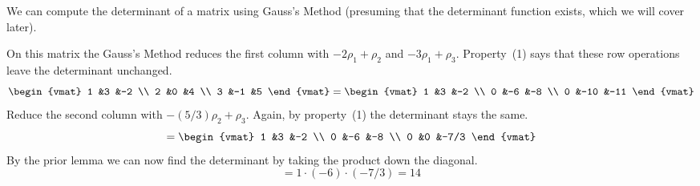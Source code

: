 \documentclass[10pt,t,serif,professionalfont]{beamer}
\begin{document}
\begin{frame}
We can compute the determinant of a matrix using Gauss's Method
(presuming that the determinant function exists, which we will
cover later).

\ex  On this matrix the Gauss's Method reduces the first column  with 
$-2\rho_1+\rho_2$ and $-3\rho_1+\rho_3$.
Property~(1) says that these row operations
leave the determinant unchanged.
\begin{equation*}
  \begin{vmat}
    1  &3  &-2 \\
    2  &0  &4  \\
    3  &-1 &5
  \end{vmat}
  =
  \begin{vmat}
    1  &3   &-2 \\
    0  &-6  &-8  \\
    0  &-10 &-11
  \end{vmat}
\end{equation*}
\pause
Reduce the second column with $-(5/3)\rho_2+\rho_3$.
Again, by property~(1) the determinant stays the same.
\begin{equation*}
  =
  \begin{vmat}
    1  &3   &-2 \\
    0  &-6  &-8  \\
    0  &0   &-7/3
  \end{vmat}
\end{equation*}
\pause
By the prior lemma we can now 
find the determinant by taking the product down the
diagonal.
\begin{equation*}
  =1\cdot(-6)\cdot(-7/3)=14
\end{equation*}
\end{frame}
\end{document}
